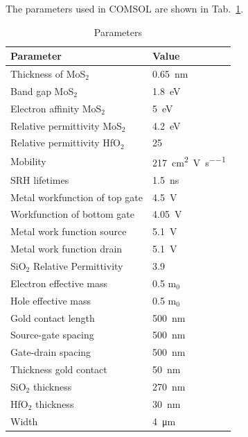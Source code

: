 \documentclass[electronics,article,submit,moreauthors,pdftex]{Definitions/mdpi}
\begin{document}
The parameters used in COMSOL are shown in Tab.~\ref{table:HfO2}.
\begin{table}[H]
	\centering
	\begin{tabular}{l l}
		\toprule
		\textbf{Parameter}             & \textbf{Value}       \\
		\midrule 
		Thickness of MoS$_2$           & \SI{0.65}{\nano \meter}              \\ 
		Band gap MoS$_2$               & \SI{1.8}{\electronvolt}               \\ 
		Electron affinity MoS$_2$      & \SI{5}{\electronvolt}               \\ 
		Relative permittivity MoS$_2$  & \SI{4.2}{\electronvolt}               \\ 
		Relative permittivity HfO$_2$  & 25                   \\ 
		Mobility                       & \SI{217}{\square \centi \meter  \per \volt \per \second} \\ 
		SRH lifetimes                  & \SI{1.5}{\nano \second}           \\ 
		Metal workfunction of top gate & \SI{4.5}{\volt}                \\ 
		Workfunction of bottom gate    & \SI{4.05}{\volt}               \\ 
		Metal work function source     & \SI{5.1}{\volt}                \\ 
		Metal work function drain      & \SI{5.1}{\volt}                \\ 
		SiO$_2$ Relative Permittivity  & 3.9                  \\ 
		Electron effective mass        & 0.5 m$_0$            \\ 
		Hole effective mass            & 0.5 m$_0$            \\ 
		Gold contact length            & \SI{500}{\nano \meter}               \\ 
		Source-gate spacing            & \SI{500}{\nano \meter}                \\ 
		Gate-drain spacing             & \SI{500}{\nano \meter}                \\ 
		Thickness gold contact         & \SI{50}{\nano \meter}                 \\ 
		SiO$_2$ thickness              & \SI{270}{\nano \meter}                \\ 
		HfO$_2$ thickness              & \SI{30}{\nano \meter}                \\ 
		Width                          & \SI{4}{\micro \meter}               \\
		\bottomrule
	\end{tabular}
	\caption{Parameters}
	\label{table:HfO2}
\end{table}
\end{document}
